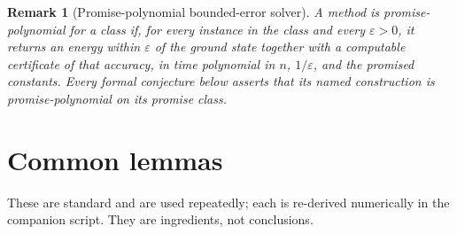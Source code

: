 \documentclass[11pt]{article}
\newtheorem{remark}{Remark}
\theoremstyle{definition}
\newcommand{\eps}{\varepsilon}
\begin{document}
\begin{remark}[Promise-polynomial bounded-error solver]
A method is \emph{promise-polynomial} for a class if, for every instance in the
class and every $\eps>0$, it returns an energy within $\eps$ of the ground state
together with a computable certificate of that accuracy, in time polynomial in
$n$, $1/\eps$, and the promised constants.  Every formal conjecture below asserts
that its named construction is promise-polynomial on its promise class.
\end{remark}

\section{Common lemmas}\label{sec:lemmas}
These are standard and are used repeatedly; each is re-derived numerically in the
companion script.  They are ingredients, not conclusions.
\end{document}
